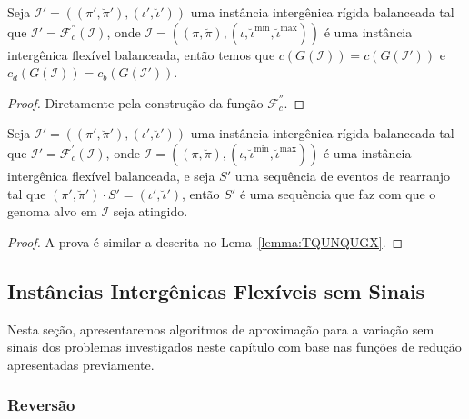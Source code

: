 

\begin{lemma}\label{lemma:PSGXFVHD}
Seja $\mathcal{I'} = ((\pi',\breve\pi'),(\iota',\breve\iota'))$ uma instância intergênica rígida balanceada tal que $\mathcal{I'} = \mathcal{F}_{c}^{''}(\mathcal{I})$, onde $\mathcal{I} = ((\pi,\breve\pi),(\iota,\breve\iota^{\min},\breve\iota^{\max}))$ é uma instância intergênica flexível balanceada, então temos que $c(G(\mathcal{I})) = c(G(\mathcal{I}'))$ e $c_d(G(\mathcal{I})) = c_b(G(\mathcal{I}'))$.
\end{lemma}
\begin{proof}
Diretamente pela construção da função $\mathcal{F}_{c}^{''}$.
\end{proof}

\begin{lemma}\label{lemma:WQOEFBXP}
Seja $\mathcal{I'} = ((\pi',\breve\pi'),(\iota',\breve\iota'))$ uma instância intergênica rígida balanceada tal que $\mathcal{I'} = \mathcal{F}_{c}^{'}(\mathcal{I})$, onde $\mathcal{I} = ((\pi,\breve\pi),(\iota,\breve\iota^{\min},\breve\iota^{\max}))$ é uma instância intergênica flexível balanceada, e seja $S'$ uma sequência de eventos de rearranjo tal que $(\pi',\breve\pi') \cdot S' = (\iota',\breve\iota')$, então $S'$ é uma sequência que faz com que o genoma alvo em $\mathcal{I}$ seja atingido.
\end{lemma}
\begin{proof}
A prova é similar a descrita no Lema~\ref{lemma:TQUNQUGX}.
\end{proof}

\subsection{Instâncias Intergênicas Flexíveis sem Sinais}

Nesta seção, apresentaremos algoritmos de aproximação para a variação sem sinais dos problemas investigados neste capítulo com base nas funções de redução apresentadas previamente.

\subsubsection{Reversão}

